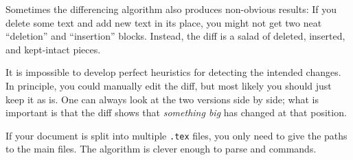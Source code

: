 \begin{gotcha}
Sometimes the differencing algorithm also produces non-obvious results:
If you delete some text and add new text in its place,
you might not get two neat ``deletion'' and ``insertion'' blocks.
Instead, the diff is a salad of deleted, inserted, and kept-intact pieces.

It is impossible to develop perfect heuristics for detecting the intended changes.
In principle, you could manually edit the diff,
but most likely you should just keep it as is.
One can always look at the two versions side by side;
what is important is that the diff shows that \emph{something big} has changed at that position.
\end{gotcha}

If your document is split into multiple \verb|.tex| files,
you only need to give the paths to the main files.
The algorithm is clever enough to parse \verb|| and \verb|| commands.
